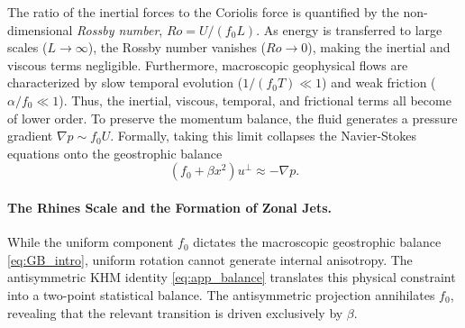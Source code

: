 \documentclass[11pt,a4paper]{article}
\numberwithin{equation}{section}
\numberwithin{theorem}{section}
\numberwithin{remark}{section}
\numberwithin{definition}{section}
\begin{document}
The ratio of the inertial forces to the Coriolis force is quantified by the non-dimensional \textit{Rossby number}, $Ro = U / (f_0 L)$. 
As energy is transferred to large scales ($L \to \infty$), the Rossby number vanishes ($Ro \to 0$), making the inertial and viscous terms negligible. Furthermore, macroscopic geophysical flows are characterized by slow temporal evolution ($1/(f_0 T) \ll 1$) and weak friction ($\alpha/f_0 \ll 1$). Thus, the inertial, viscous, temporal, and frictional terms all become of lower order. To preserve the momentum balance, the fluid generates a pressure gradient $\nabla p \sim f_0 U$. Formally, taking this limit collapses the Navier-Stokes equations onto the geostrophic balance
\begin{equation}\label{eq:GB_intro}
    (f_0 + \beta x^2) u^\perp \approx -\nabla p.
\end{equation}

\paragraph{The Rhines Scale and the Formation of Zonal Jets.}
While the uniform component $f_0$ dictates the macroscopic geostrophic balance \eqref{eq:GB_intro}, uniform rotation cannot generate internal anisotropy. The antisymmetric KHM identity \eqref{eq:app_balance} translates this physical constraint into a two-point statistical balance. The antisymmetric projection annihilates $f_0$, revealing that the relevant transition is driven exclusively by $\beta$.
\end{document}
